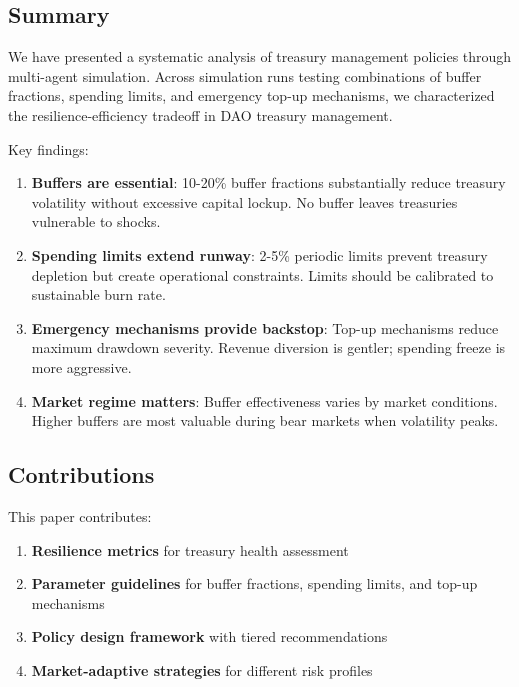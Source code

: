 
\subsection{Summary}

We have presented a systematic analysis of treasury management policies through multi-agent simulation. Across \experimentruns{} simulation runs testing combinations of buffer fractions, spending limits, and emergency top-up mechanisms, we characterized the resilience-efficiency tradeoff in DAO treasury management.

Key findings:

\begin{enumerate}
    \item \textbf{Buffers are essential}: 10-20\% buffer fractions substantially reduce treasury volatility without excessive capital lockup. No buffer leaves treasuries vulnerable to shocks.

    \item \textbf{Spending limits extend runway}: 2-5\% periodic limits prevent treasury depletion but create operational constraints. Limits should be calibrated to sustainable burn rate.

    \item \textbf{Emergency mechanisms provide backstop}: Top-up mechanisms reduce maximum drawdown severity. Revenue diversion is gentler; spending freeze is more aggressive.

    \item \textbf{Market regime matters}: Buffer effectiveness varies by market conditions. Higher buffers are most valuable during bear markets when volatility peaks.
\end{enumerate}

\subsection{Contributions}

This paper contributes:

\begin{enumerate}
    \item \textbf{Resilience metrics} for treasury health assessment
    \item \textbf{Parameter guidelines} for buffer fractions, spending limits, and top-up mechanisms
    \item \textbf{Policy design framework} with tiered recommendations
    \item \textbf{Market-adaptive strategies} for different risk profiles
\end{enumerate}

